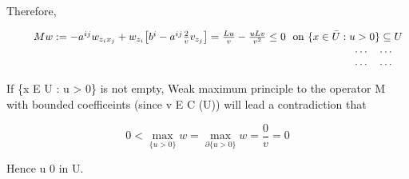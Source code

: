 \documentclass{article}
\begin{document}
Therefore,


\begin{equation}
\begin{array} { r l r } & { } & { M w : = - a ^ { i j } w _ { z _ { i } x _ { j } } + w _ { z _ { i } } \big [ b ^ { i } - a ^ { i j } \frac { 2 } { v } v _ { z _ { j } } \big ] = \frac { L u } { v } - \frac { u L v } { v ^ { 2 } } \leq 0 ~ \mathrm { ~ o n ~ } \{ x \in \bar { U } : u > 0 \} \subseteq U } \\ & { } & { \qquad \dots \quad \dots \quad } \\ & { } & { \qquad \dots \quad \dots \quad } \end{array}
\end{equation}


If \{x E U : u > 0\} is not empty, Weak maximum principle to the operator M with bounded
coefficeints (since v E C (U)) will lead a contradiction that


\begin{equation}
0 < \operatorname* { m a x } _ { \{ u > 0 \} } w = \operatorname* { m a x } _ { \partial \{ u > 0 \} } w = \frac { 0 } { v } = 0
\end{equation}


Hence u  0 in U.
\end{document}
